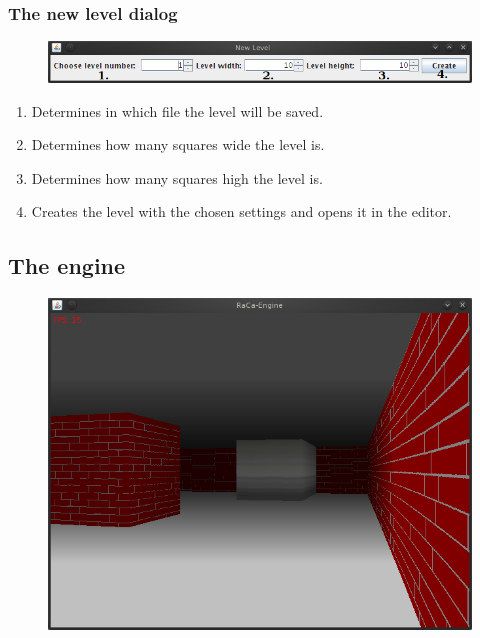 \documentclass[a4paper,10pt]{article}
\begin{document}
\subsubsection{The new level dialog}

\begin{figure}[h]
 \centering
 \includegraphics[scale=0.60]{new_level_screenshot.png}
\end{figure}

\begin{enumerate}
\item Determines in which file the level will be saved.
\item Determines how many squares wide the level is.
\item Determines how many squares high the level is.
\item Creates the level with the chosen settings and opens it in the editor.
\end{enumerate}

\subsection{The engine}

\begin{figure}[h!]
 \centering
 \includegraphics[scale=0.65]{engine_screenshot.png}
\end{figure}
\end{document}
